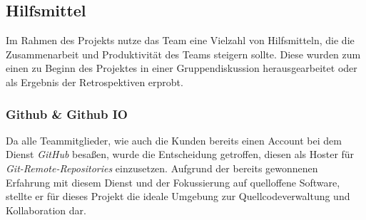 \documentclass[10pt, a4paper]{article}
\begin{document}
\subsection{Hilfsmittel}
Im Rahmen des Projekts nutze das Team eine Vielzahl von Hilfsmitteln, die die Zusammenarbeit und Produktivität des Teams steigern sollte.
Diese wurden zum einen zu Beginn des Projektes in einer Gruppendiskussion herausgearbeitet oder als Ergebnis der Retrospektiven erprobt.

\subsubsection{Github \& Github IO}
Da alle Teammitglieder, wie auch die Kunden bereits einen Account bei dem Dienst \textit{GitHub} besaßen, wurde die Entscheidung getroffen, diesen als Hoster für \textit{Git-Remote-Repositories} einzusetzen.
Aufgrund der bereits gewonnenen Erfahrung mit diesem Dienst und der Fokussierung auf quelloffene Software, stellte er für dieses Projekt die ideale Umgebung zur Quellcodeverwaltung und Kollaboration dar.
\end{document}
